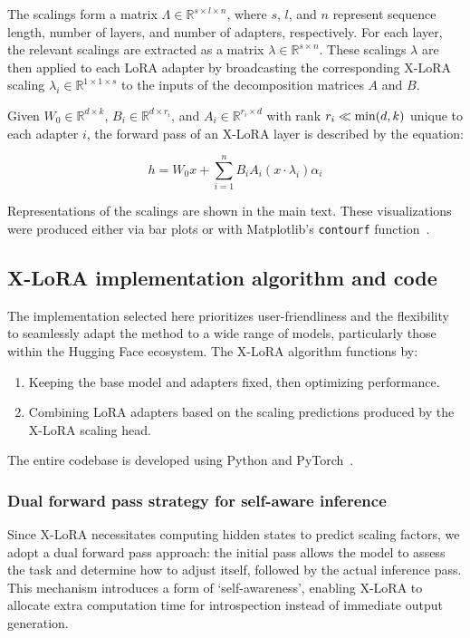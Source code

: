 The scalings form a matrix $\Lambda \in \mathbb{R}^{s \times l \times n}$, where $s$, $l$, and $n$ represent sequence length, number of layers, and number of adapters, respectively. For each layer, the relevant scalings are extracted as a matrix $\lambda \in \mathbb{R}^{s \times n}$. These scalings $\lambda$ are then applied to each LoRA adapter by broadcasting the corresponding X-LoRA scaling $\lambda_i \in \mathbb{R}^{1 \times 1 \times s}$ to the inputs of the decomposition matrices $A$ and $B$.

Given $W_0 \in \mathbb{R}^{d \times k}$, $B_i \in \mathbb{R}^{d \times r_i}$, and $A_i \in \mathbb{R}^{r_i \times d}$ with rank $r_i \ll {\rm min}(d,k)$ unique to each adapter $i$, the forward pass of an X-LoRA layer is described by the equation:

\begin{equation}
    h = W_0 x + \sum_{i=1}^{n} B_i A_i (x \cdot \lambda_i) \alpha_i
\end{equation}

Representations of the scalings are shown in the main text. These visualizations were produced either via bar plots or with Matplotlib’s \texttt{contourf} function~\cite{MatplotlibDocumentation}.

\subsection{X-LoRA implementation algorithm and code} The implementation selected here prioritizes user-friendliness and the flexibility to seamlessly adapt the method to a wide range of models, particularly those within the Hugging Face ecosystem. The X-LoRA algorithm functions by:

\begin{enumerate}
    \item Keeping the base model and adapters fixed, then optimizing performance.
    \item Combining LoRA adapters based on the scaling predictions produced by the X-LoRA scaling head.
\end{enumerate}

The entire codebase is developed using Python and PyTorch~\cite{Paszke2019PyTorchLibrary}.

\subsubsection{Dual forward pass strategy for self-aware inference} Since X-LoRA necessitates computing hidden states to predict scaling factors, we adopt a dual forward pass approach: the initial pass allows the model to assess the task and determine how to adjust itself, followed by the actual inference pass. This mechanism introduces a form of `self-awareness', enabling X-LoRA to allocate extra computation time for introspection instead of immediate output generation.

